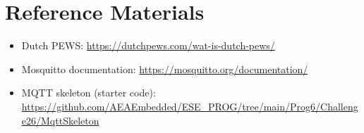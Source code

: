 \documentclass[11pt,a4paper]{article}
\begin{document}
\section{Reference Materials}
\begin{itemize}
  \item Dutch PEWS: \url{https://dutchpews.com/wat-is-dutch-pews/}
  \item Mosquitto documentation: \url{https://mosquitto.org/documentation/}
  \item MQTT skeleton (starter code): \url{https://github.com/AEAEmbedded/ESE_PROG/tree/main/Prog6/Challenge26/MqttSkeleton}
\end{itemize}
\end{document}
